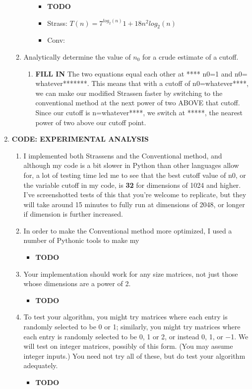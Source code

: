 \documentclass[11pt]{article}
\begin{document}
\begin{enumerate}
\begin{enumerate}
\begin{enumerate}
            \begin{itemize}
                \item \textbf{TODO}
                \item Strass: $ T(n) = 7^{log_2(n)}1+18n^2log_2(n) $
                \item Conv:
            \end{itemize}
        \end{enumerate}
        \item Analytically determine the value of $n_0$ for a crude estimate of a cutoff.
        \begin{enumerate}
            \item \textbf{FILL IN} The two equations equal each other at **** n0=1 and n0= whatever*******. This means that with a cutoff of n0=whatever****, we can make our modified Strassen faster by switching to the conventional method at the next power of two ABOVE that cutoff. Since our cutoff is n=whatever****, we switch at *****, the nearest power of two above our cutoff point.
        \end{enumerate}
    \end{enumerate}
    \item \textbf{CODE: EXPERIMENTAL ANALYSIS}
    
    \begin{enumerate}
        \item I implemented both Strassens and the Conventional method, and although my code is a bit slower in Python than other languages allow for, a lot of testing time led me to see that the best cutoff value of n0, or the variable cutoff in my code, is \textbf{32} for dimensions of 1024 and higher. I've screenshotted tests of this that you're welcome to replicate, but they will take around 15 minutes to fully run at dimensions of 2048, or longer if dimension is further increased.
        \item In order to make the Conventional method more optimized, I used a number of Pythonic tools to make my 
        \begin{itemize}
            \item \textbf{TODO}
        \end{itemize}
        \item Your implementation should work for any size matrices, not just those whose dimensions are a power of 2.
        \begin{itemize}
            \item \textbf{TODO}
        \end{itemize}
        \item To test your algorithm, you might try matrices where each entry is randomly selected to be 0 or 1; similarly, you might try matrices where each entry is randomly selected to be 0, 1 or 2, or instead 0, 1, or −1. We will test on integer matrices, possibly of this form. (You may assume integer inputs.) You need not try all of these, but do test your algorithm adequately.
        \begin{itemize}
            \item \textbf{TODO}
        \end{itemize}
        

\end{enumerate}
\end{enumerate}
\end{document}
